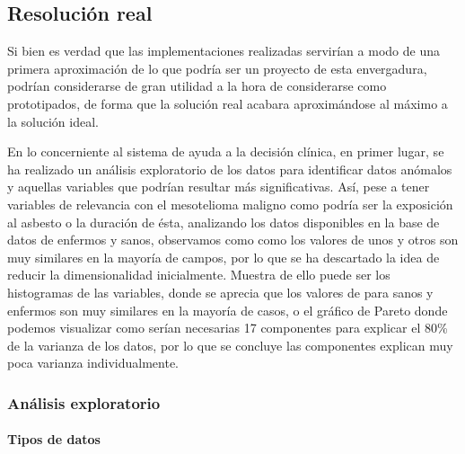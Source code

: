 \documentclass{article}
\newcommand{\subsubsubsection}[1]{\paragraph{#1}\mbox{}\\}
\begin{document}
\subsection{Resolución real}

Si bien es verdad que las implementaciones realizadas servirían a modo
de una primera aproximación de lo que podría ser un proyecto  de  esta
envergadura, podrían considerarse  de  gran  utilidad  a  la  hora  de
considerarse como prototipados, de forma que la solución real  acabara
aproximándose al máximo a la solución ideal.

En lo concerniente al sistema de  ayuda  a  la	decisión  clínica,  en
primer lugar, se ha realizado un análisis exploratorio	de  los  datos
para identificar datos	anómalos  y  aquellas  variables  que  podrían
resultar más significativas. Así, pese a tener variables de relevancia
con el mesotelioma maligno como podría ser la exposición al asbesto  o
la duración de ésta, analizando los datos disponibles en  la  base  de
datos de enfermos y sanos, observamos como como los valores de unos  y
otros son muy similares en la mayoría de campos,  por  lo  que	se  ha
descartado la idea de reducir la dimensionalidad inicialmente. Muestra
de ello puede ser los histogramas de las variables, donde  se  aprecia
que los valores de para sanos y  enfermos  son	muy  similares	en  la
mayoría de casos, o el gráfico de Pareto donde podemos visualizar como
serían necesarias 17 componentes para explicar el 80\% de la  varianza
de los datos, por lo que se concluye las componentes explican muy poca
varianza individualmente.

\newpage
\subsubsection{Análisis exploratorio}
\subsubsubsection{Tipos de datos}
\end{document}
